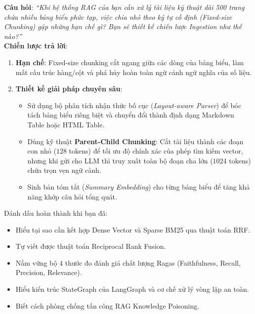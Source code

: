 \begin{interviewbox}
\textbf{Câu hỏi}: \textit{``Khi hệ thống RAG của bạn cần xử lý tài liệu kỹ thuật dài 500 trang chứa nhiều bảng biểu phức tạp, việc chia nhỏ theo ký tự cố định (Fixed-size Chunking) gặp những hạn chế gì? Bạn sẽ thiết kế chiến lược Ingestion như thế nào?''}\\
\textbf{Chiến lược trả lời}:
\begin{enumerate}
  \item \textbf{Hạn chế}: Fixed-size chunking cắt ngang giữa các dòng của bảng biểu, làm mất cấu trúc hàng/cột và phá hủy hoàn toàn ngữ cảnh ngữ nghĩa của số liệu.
  \item \textbf{Thiết kế giải pháp chuyên sâu}:
    \begin{itemize}
      \item Sử dụng bộ phân tích nhận thức bố cục (\textit{Layout-aware Parser}) để bóc tách bảng biểu riêng biệt và chuyển đổi thành định dạng Markdown Table hoặc HTML Table.
      \item Dùng kỹ thuật \textbf{Parent-Child Chunking}: Cắt tài liệu thành các đoạn con nhỏ ($128$ tokens) để tối ưu độ chính xác của phép tìm kiếm vector, nhưng khi gửi cho LLM thì truy xuất toàn bộ đoạn cha lớn ($1024$ tokens) chứa trọn vẹn ngữ cảnh.
      \item Sinh bản tóm tắt (\textit{Summary Embedding}) cho từng bảng biểu để tăng khả năng khớp câu hỏi tổng quát.
    \end{itemize}
\end{enumerate}
\end{interviewbox}

\begin{checkpointbox}
Đánh dấu hoàn thành khi bạn đã:
\begin{itemize}
  \item[$\square$] Hiểu tại sao cần kết hợp Dense Vector và Sparse BM25 qua thuật toán RRF.
  \item[$\square$] Tự viết được thuật toán Reciprocal Rank Fusion.
  \item[$\square$] Nắm vững bộ 4 thước đo đánh giá chất lượng Ragas (Faithfulness, Recall, Precision, Relevance).
  \item[$\square$] Hiểu kiến trúc StateGraph của LangGraph và cơ chế xử lý vòng lặp an toàn.
  \item[$\square$] Biết cách phòng chống tấn công RAG Knowledge Poisoning.
\end{itemize}
\end{checkpointbox}
